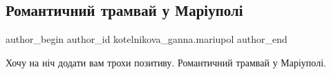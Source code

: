  
 
 
 
 

\subsection{Романтичний трамвай у Маріуполі}
\label{sec:16_02_2018.fb.kotelnikova_ganna.mariupol.1.romantichnii_tramvai}

\ifcmt
 author_begin
   author_id kotelnikova_ganna.mariupol
 author_end
\fi

Хочу на ніч додати вам трохи позитиву. Романтичний трамвай у Маріуполі.



